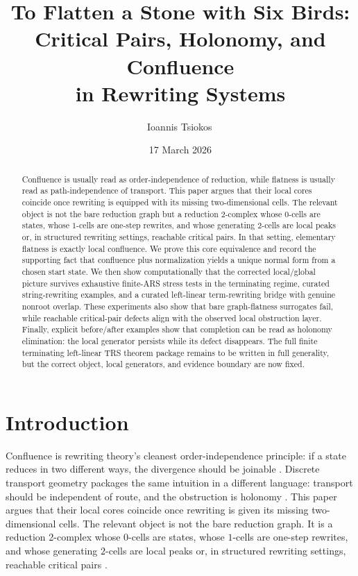 \documentclass[11pt]{article}
\title{To Flatten a Stone with Six Birds:\\[4pt]
Critical Pairs, Holonomy, and Confluence\\
in Rewriting Systems}
\author{Ioannis Tsiokos\,\orcidA{}}
\date{17 March 2026}
\numberwithin{equation}{section}
\theoremstyle{definition}
\theoremstyle{remark}
\begin{document}
\maketitle
\thispagestyle{firstpage}

\begin{abstract}
\noindent
Confluence is usually read as order-independence of reduction, while flatness is usually read as path-independence of transport.
This paper argues that their local cores coincide once rewriting is equipped with its missing two-dimensional cells.
The relevant object is not the bare reduction graph but a reduction 2-complex whose $0$-cells are states, whose $1$-cells are one-step rewrites, and whose generating $2$-cells are local peaks or, in structured rewriting settings, reachable critical pairs.
In that setting, elementary flatness is exactly local confluence.
We prove this core equivalence and record the supporting fact that confluence plus normalization yields a unique normal form from a chosen start state.
We then show computationally that the corrected local/global picture survives exhaustive finite-ARS stress tests in the terminating regime, curated string-rewriting examples, and a curated left-linear term-rewriting bridge with genuine nonroot overlap.
These experiments also show that bare graph-flatness surrogates fail, while reachable critical-pair defects align with the observed local obstruction layer.
Finally, explicit before/after examples show that completion can be read as holonomy elimination: the local generator persists while its defect disappears.
The full finite terminating left-linear TRS theorem package remains to be written in full generality, but the correct object, local generators, and evidence boundary are now fixed.
\end{abstract}

\section{Introduction}
\label{sec:introduction}

Confluence is rewriting theory's cleanest order-independence principle: if a state reduces in two different ways, the divergence should be joinable \cite{BaaderNipkow1998,Huet1980,DershowitzJouannaud1990,Terese2003}. Discrete transport geometry packages the same intuition in a different language: transport should be independent of route, and the obstruction is holonomy \cite{Meneses2021,BaezMuniain1994}. This paper argues that their local cores coincide once rewriting is given its missing two-dimensional cells. The relevant object is not the bare reduction graph. It is a reduction 2-complex whose $0$-cells are states, whose $1$-cells are one-step rewrites, and whose generating $2$-cells are local peaks or, in structured rewriting settings, reachable critical pairs \cite{Mimram2023,GuiraudMalbos2018,GuiraudMalbos2012}.
\end{document}
